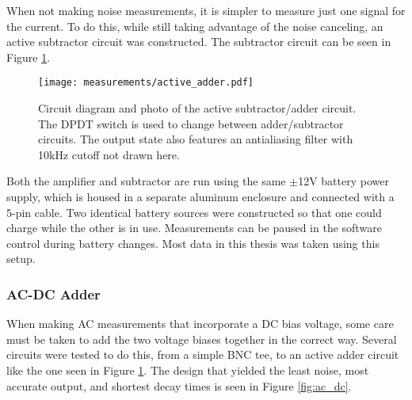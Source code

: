 When not making noise measurements, it is simpler to measure just one signal for the current. To do this, while still taking advantage of the noise canceling, an active subtractor circuit was constructed. The subtractor circuit can be seen in Figure \ref{fig:subtractor}. 

\begin{figure}
    \centering
    \texttt{[image: measurements/active\_adder.pdf]}
    \caption{Circuit diagram and photo of the active subtractor/adder circuit. The DPDT switch is used to change between adder/subtractor circuits. The output state also features an antialiasing filter with 10kHz cutoff not drawn here.}
    \label{fig:subtractor}
\end{figure}

Both the amplifier and subtractor are run using the same $\pm$12V battery power supply, which is housed in a separate aluminum enclosure and connected with a 5-pin cable. Two identical battery sources were constructed so that one could charge while the other is in use. Measurements can be paused in the software control during battery changes. Most data in this thesis was taken using this setup.


\subsubsection*{AC-DC Adder}
\label{sec:adder}

When making AC measurements that incorporate a DC bias voltage, some care must be taken to add the two voltage biases together in the correct way. Several circuits were tested to do this, from a simple BNC tee, to an active adder circuit like the one seen in Figure \ref{fig:subtractor}. The design that yielded the least noise, most accurate output, and shortest decay times is seen in Figure \ref{fig:ac_dc}.

